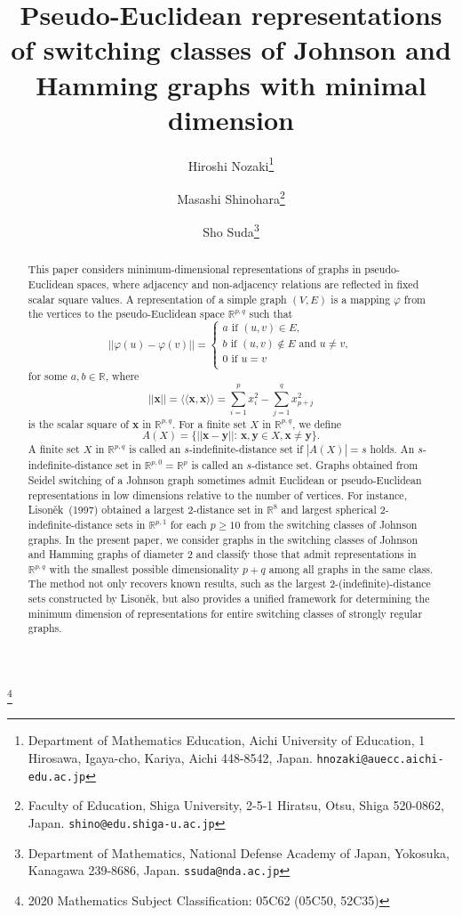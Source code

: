 \documentclass[a4paper, 11pt]{article}
\title{Pseudo-Euclidean representations of switching classes of Johnson and Hamming graphs with minimal dimension}
\author{
Hiroshi Nozaki\thanks{Department of Mathematics Education, 
	Aichi University of Education, 
	1 Hirosawa, Igaya-cho, 
	Kariya, Aichi 448-8542, 
	Japan. {\tt hnozaki@auecc.aichi-edu.ac.jp}}
\and 
Masashi Shinohara\thanks{Faculty of Education, 
	Shiga University,
	2-5-1 Hiratsu, Otsu, Shiga 520-0862, 
	Japan.  
	{\tt shino@edu.shiga-u.ac.jp}}
\and
Sho Suda\thanks{Department of Mathematics, National Defense Academy of Japan, Yokosuka, Kanagawa 239-8686, Japan.
{\tt ssuda@nda.ac.jp}}
}
\theoremstyle{definition}
\begin{document}
\maketitle

\renewcommand{\thefootnote}{\fnsymbol{footnote}}
\footnote[0]{2020 Mathematics Subject Classification: 05C62 (05C50, 52C35)
}

\begin{abstract}
This paper considers minimum-dimensional representations of graphs in pseudo-Euclidean spaces, where adjacency and non-adjacency relations are reflected in fixed scalar square values. 
   A representation of a simple graph $(V,E)$ is a mapping $\varphi$ from the vertices to the pseudo-Euclidean space $\mathbb{R}^{p,q}$ such that
 \[
 ||\varphi(u)-\varphi(v)||=\begin{cases}
 a \text{ if $(u,v) \in E$}, \\
 b \text{ if $(u,v) \not\in E$ and $u\ne v$},\\
 0 \text{ if $u=v$}\\
 \end{cases}
 \]
for some $a,b \in \mathbb{R}$, where \[||\boldsymbol{x}||=\langle \langle \boldsymbol{x},\boldsymbol{x} \rangle \rangle=
\sum_{i=1}^p x_i^2- \sum_{j=1}^q x_{p+j}^2
\] is the scalar square of $\boldsymbol{x}$ in $\mathbb{R}^{p,q}$.   
 For a finite set $X$ in $\mathbb{R}^{p,q}$, 
 we define 
 \[
 A(X)=\{||\boldsymbol{x}- \boldsymbol{y} || \colon\, \boldsymbol{x},\boldsymbol{y} \in X, \boldsymbol{x} \ne \boldsymbol{y}\}. 
 \]
 A finite set $X$ in $\mathbb{R}^{p,q}$ is called an $s$-indefinite-distance set
 if $|A(X)|=s$ holds. 
 An $s$-indefinite-distance set in $\mathbb{R}^{p,0}=\mathbb{R}^p$ is called an $s$-distance set.  
    Graphs obtained from Seidel switching of a Johnson graph sometimes admit Euclidean or pseudo-Euclidean representations in low dimensions relative to the number of vertices. 
    For instance, Lison\v{e}k~(1997) obtained a largest 2-distance set in $\mathbb{R}^8$ and largest spherical 2-indefinite-distance sets in $\mathbb{R}^{p,1}$ for each $p\geq 10$ from the switching classes of Johnson graphs. In the present paper, we consider graphs in the switching classes of Johnson and Hamming graphs of diameter 2 and classify those that admit representations in $\mathbb{R}^{p,q}$ with the smallest possible dimensionality $p+q$ among all graphs in the same class. 
    The method not only recovers known results, such as the largest 2-(indefinite)-distance sets constructed by Lison\v{e}k, but also provides a unified framework for determining the minimum dimension of representations for entire switching classes of strongly regular graphs.
   
\end{abstract}
\end{document}
